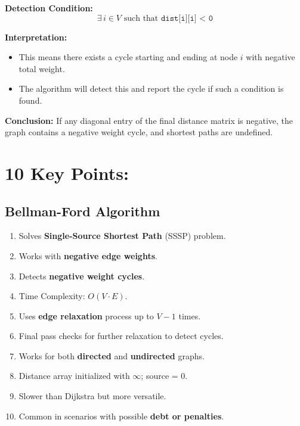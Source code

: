 \documentclass[14pt,a4paper]{extarticle}
\begin{document}
\textbf{Detection Condition:}
\[
\exists\, i \in V \text{ such that } \texttt{dist[i][i] < 0}
\]

\textbf{Interpretation:}
\begin{itemize}[leftmargin=2em]
    \item This means there exists a cycle starting and ending at node \(i\) with negative total weight.
    \item The algorithm will detect this and report the cycle if such a condition is found.
\end{itemize}

\textbf{Conclusion:} If any diagonal entry of the final distance matrix is negative, the graph contains a negative weight cycle, and shortest paths are undefined.



\newpage
\section{10 Key Points:}
\subsection{Bellman-Ford Algorithm}
\begin{enumerate}[leftmargin=1.5em, label=\textbf{\arabic*.}]
    \item Solves \textbf{Single-Source Shortest Path} (SSSP) problem.
    \item Works with \textbf{negative edge weights}.
    \item Detects \textbf{negative weight cycles}.
    \item Time Complexity: \( O(V \cdot E) \).
    \item Uses \textbf{edge relaxation} process up to \( V - 1 \) times.
    \item Final pass checks for further relaxation to detect cycles.
    \item Works for both \textbf{directed} and \textbf{undirected} graphs.
    \item Distance array initialized with \( \infty \); source = 0.
    \item Slower than Dijkstra but more versatile.
    \item Common in scenarios with possible \textbf{debt or penalties}.
\end{enumerate}
\end{document}
